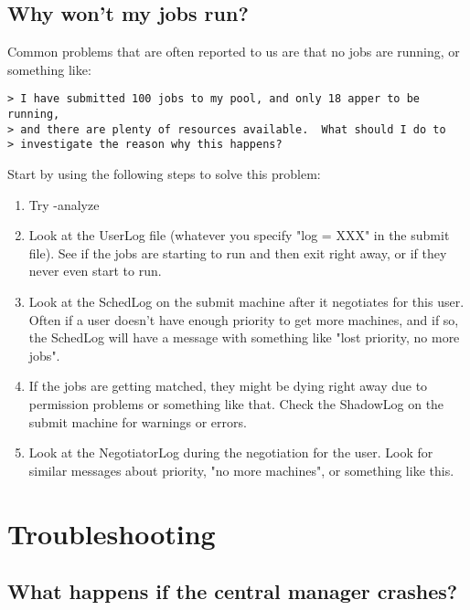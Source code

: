 \Todo

\subsection{Why won't my jobs run?}

Common problems that are often reported to us are that no jobs are running, or
something like:

\begin{verbatim}
> I have submitted 100 jobs to my pool, and only 18 apper to be running,
> and there are plenty of resources available.  What should I do to
> investigate the reason why this happens?
\end{verbatim}

Start by using the following steps to solve this problem:

\begin{enumerate}
\item Try  -analyze 

\item Look at the UserLog file (whatever you specify "log = XXX" in the
submit file).  See if the jobs are starting to run and then exit right
away, or if they never even start to run.

\item Look at the SchedLog on the submit machine after it negotiates
for this user.  Often if a user doesn't have enough priority to get
more machines, and if so, the SchedLog will have a message with something
like "lost priority, no more jobs".

\item If the jobs are getting matched, they might be dying right away due
to permission problems or something like that.  Check the ShadowLog on
the submit machine for warnings or errors.

\item Look at the NegotiatorLog during the negotiation for the user.
Look for similar messages about priority, "no more machines", or
something like this.  

\end{enumerate}

\section{Troubleshooting}


\subsection{What happens if the central manager crashes?} 

